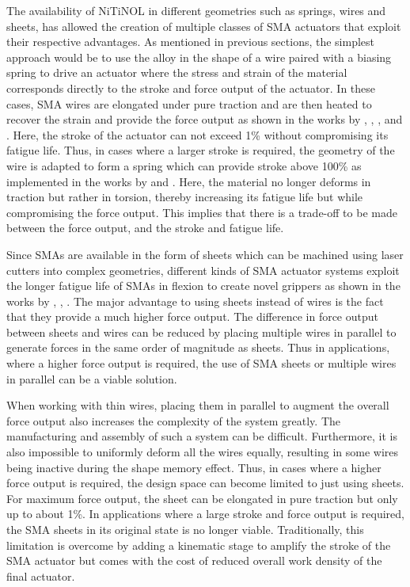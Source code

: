 The availability of NiTiNOL in different geometries such as springs, wires and sheets, has allowed the creation of multiple classes of SMA actuators that exploit their respective advantages. As mentioned in previous sections, the simplest approach would be to use the alloy in the shape of a wire paired with a biasing spring to drive an actuator where the stress and strain of the material corresponds directly to the stroke and force output of the actuator. In these cases, SMA wires are elongated under pure traction and are then heated to recover the strain and provide the force output as shown in the works by \cite{kyungDesignMicrogripperMicromanipulation2008}, \cite{welschVacuumGripperSystem2018}, \cite{haibinModelingGraspingForce2018}, and \cite{andrianesisDevelopmentControlMultifunctional2015}. Here, the stroke of the actuator can not exceed 1\% without compromising its fatigue life. Thus, in cases where a larger stroke is required, the geometry of the wire is adapted to form a spring which can provide stroke above 100\% as implemented in the works by \cite{ikutaMicroMiniatureShape1990} and \cite{zhakypovOrigamiInspiredReconfigurableSuction2018}. Here, the material no longer deforms in traction but rather in torsion, thereby increasing its fatigue life but while compromising the force output. This implies that there is a trade-off to be made between the force output, and the stroke and fatigue life.

Since SMAs are available in the form of sheets which can be machined using laser cutters into complex geometries, different kinds of SMA actuator systems exploit the longer fatigue life of SMAs in flexion to create novel grippers as shown in the works by \cite{kohlSMAMicrogripperSystem2002}, \cite{benardThinfilmShapememoryAlloy1998}, \cite{zhakypovOrigamiInspiredReconfigurableSuction2018}. The major advantage to using sheets instead of wires is the fact that they provide a much higher force output. The difference in force output between sheets and wires can be reduced by placing multiple wires in parallel to generate forces in the same order of magnitude as sheets. Thus in applications, where a higher force output is required, the use of SMA sheets or multiple wires in parallel can be a viable solution.

When working with thin wires, placing them in parallel to augment the overall force output also increases the complexity of the system greatly. The manufacturing and assembly of such a system can be difficult. Furthermore, it is also impossible to uniformly deform all the wires equally, resulting in some wires being inactive during the shape memory effect. Thus, in cases where a higher force output is required, the design space can become limited to just using sheets. For maximum force output, the sheet can be elongated in pure traction but only up to about 1\%. In applications where a large stroke and force output is required, the SMA sheets in its original state is no longer viable. Traditionally, this limitation is overcome by adding a kinematic stage to amplify the stroke of the SMA actuator but comes with the cost of reduced overall work density of the final actuator.

